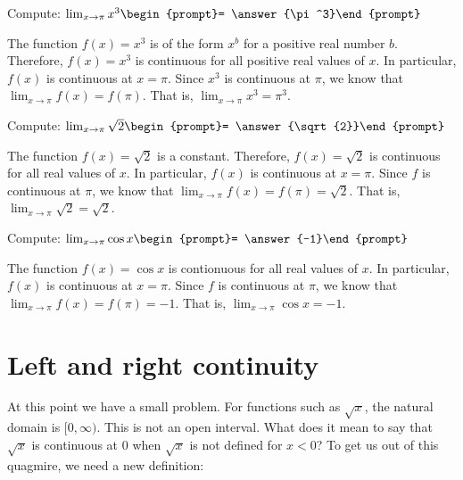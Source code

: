 \documentclass{ximera}
\begin{document}
\begin{question}
  Compute:
  $\lim_{x\to \pi} x^3\begin{prompt}= \answer{\pi^3}\end{prompt}$
  \begin{feedback}
    The function $f(x)=x^3$ is of the form $x^b$ for a positive real number
    $b$.  Therefore, $f(x)=x^3$ is continuous for all positive real values of
    $x$.  In particular, $f(x)$ is continuous at $x=\pi$.  Since $x^3$
    is continuous at $\pi$, we know that $\lim_{x\to \pi} f(x) = f(\pi)$.
    That is, $\lim_{x\to \pi} x^3 = \pi^3$.
  \end{feedback}  
\end{question}
\begin{question}
  Compute:
  $\lim_{x\to \pi} \sqrt{2}\begin{prompt}= \answer{\sqrt{2}}\end{prompt}$
  \begin{feedback}
    The function $f(x)= \sqrt{2}$ is a constant.
  Therefore, $f(x)=\sqrt{2}$ is continuous for all real values of
    $x$.  In particular, $f(x)$ is continuous at $x=\pi$.  Since $f$
    is continuous at $\pi$, we know that $\lim_{x\to \pi} f(x) = f(\pi)=\sqrt{2}$.
    That is, $\lim_{x\to \pi} \sqrt{2}= \sqrt{2}$.
  \end{feedback}  
\end{question}
\begin{question}
  Compute:
  $\lim_{x\to \pi} \cos{x}\begin{prompt}= \answer{-1}\end{prompt}$
  \begin{feedback}
    The function $f(x)=  \cos{x}$ is contionuous
 for all real values of
    $x$.  In particular, $f(x)$ is continuous at $x=\pi$.  Since $f$
    is continuous at $\pi$, we know that $\lim_{x\to \pi} f(x) = f(\pi)=-1$.
    That is, $\lim_{x\to \pi} \cos{x}= -1$.
  \end{feedback}  
\end{question}

\section{Left and right continuity}


At this point we have a small problem.  For functions such as
$\sqrt{x}$, the natural domain is $[0, \infty)$.  This is not an
open interval.  What does it mean to say that $\sqrt{x}$ is continuous
at $0$ when $\sqrt{x}$ is not defined for $x<0$? To get us out of this
quagmire, we need a new definition:
\end{document}
